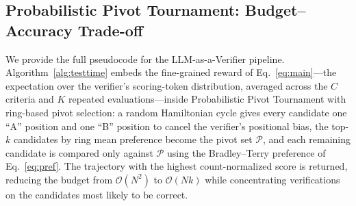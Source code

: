 \subsection{Probabilistic Pivot Tournament: Budget--Accuracy Trade-off}
\label{app:ppt}

We provide the full pseudocode for the LLM-as-a-Verifier pipeline. Algorithm~\ref{alg:testtime} embeds the fine-grained reward of Eq.~\ref{eq:main}---the expectation over the verifier's scoring-token distribution, averaged across the $C$ criteria and $K$ repeated evaluations---inside Probabilistic Pivot Tournament with ring-based pivot selection: a random Hamiltonian cycle gives every candidate one ``A'' position and one ``B'' position to cancel the verifier's positional bias, the top-$k$ candidates by ring mean preference become the pivot set $\mathcal{P}$, and each remaining candidate is compared only against $\mathcal{P}$ using the Bradley–Terry preference of Eq.~\ref{eq:pref}. The trajectory with the highest count-normalized score is returned, reducing the budget from $\mathcal{O}(N^2)$ to $\mathcal{O}(Nk)$ while concentrating verifications on the candidates most likely to be correct.


